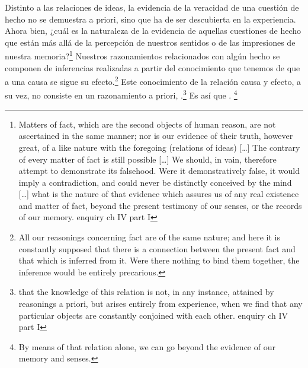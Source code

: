 Distinto a las relaciones de ideas, la evidencia de la veracidad de una cuestión
de hecho no se demuestra a priori, sino que ha de ser descubierta en la
experiencia. Ahora bien, ¿cuál es la naturaleza de la evidencia de aquellas
cuestiones de hecho que están más allá de la percepción de nuestros sentidos o
de las impresiones de nuestra memoria?\footnote{Matters of fact, which are the
  second objects of human reason, are not ascertained in the same manner; nor is
  our evidence of their truth, however great, of a like nature with the
  foregoing (relations of ideas) [\ldots] The contrary of every matter of fact
  is still possible [\ldots] We should, in vain, therefore attempt to
  demonstrate its falsehood. Were it demonstratively false, it would imply a
  contradiction, and could never be distinctly conceived by the mind [\ldots]
  what is the nature of that evidence which assures us of any real existence and
  matter of fact, beyond the present testimony of our senses, or the records of
  our memory. enquiry ch IV part I} Nuestros razonamientos relacionados con
algún hecho se componen de inferencias realizadas a partir del conocimiento que
tenemos de que a una causa se sigue su efecto.\footnote{All our reasonings
  concerning fact are of the same nature; and here it is constantly supposed
  that there is a connection between the present fact and that which is inferred
  from it. Were there nothing to bind them together, the inference would be
  entirely precarious.} Este conocimiento de la relación causa y efecto, a su
vez, no consiste en un razonamiento a priori, .\footnote{that the
  knowledge of this relation is not, in any instance, attained by reasonings a
  priori, but arises entirely from experience, when we find that any particular
  objects are constantly conjoined with each other. enquiry ch IV part I} Es así
que . \footnote{By means of that relation alone, we
  can go beyond the evidence of our memory and senses.}

